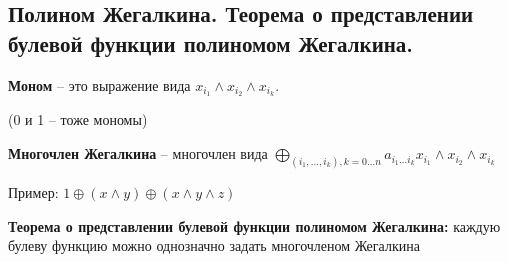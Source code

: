 \subsection{Полином Жегалкина. Теорема о представлении булевой функции полиномом Жегалкина.}

\textbf{Моном} -- это выражение вида $x_{i_1} \wedge x_{i_2} \wedge x_{i_k}$.

(0 и 1 -- тоже мономы)

\textbf{Многочлен Жегалкина} -- многочлен вида $\bigoplus\limits_{(i_1,\ldots,i_k), k = 0 \ldots n} a_{i_1\ldots i_k}x_{i_1} \wedge x_{i_2} \wedge x_{i_k}$

Пример: $1 \oplus (x \wedge y) \oplus (x \wedge y \wedge z)$

\textbf{Теорема о представлении булевой функции полиномом Жегалкина:} каждую булеву функцию можно однозначно задать многочленом Жегалкина
